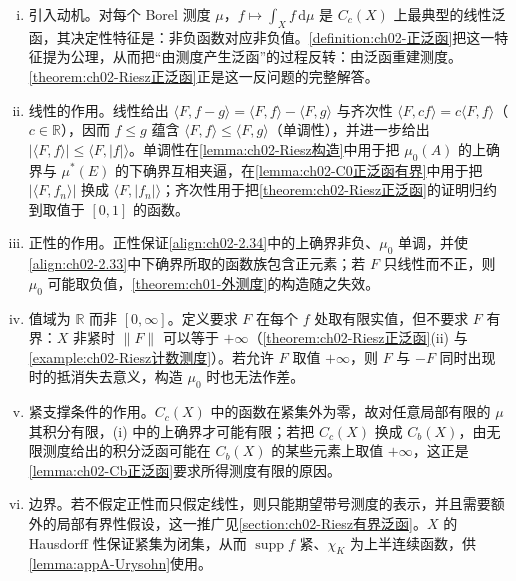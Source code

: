 \documentclass[../../main.tex]{subfiles}%
\begin{document}
\begin{remark}\label{remark:ch02-正泛函}
\begin{enumerate}[(i)]
\item 引入动机。对每个 Borel 测度 $\mu$，$f\mapsto\int_Xf\,\mathrm{d}\mu$ 是 $C_c(X)$ 上最典型的线性泛函，其决定性特征是：非负函数对应非负值。\cref{definition:ch02-正泛函}把这一特征提为公理，从而把“由测度产生泛函”的过程反转：由泛函重建测度。\cref{theorem:ch02-Riesz正泛函}正是这一反问题的完整解答。
\item 线性的作用。线性给出 $\langle F,f-g\rangle=\langle F,f\rangle-\langle F,g\rangle$ 与齐次性 $\langle F,cf\rangle=c\langle F,f\rangle$（$c\in\mathbb R$），因而 $f\leqslant g$ 蕴含 $\langle F,f\rangle\leqslant\langle F,g\rangle$（单调性），并进一步给出 $\left|\langle F,f\rangle\right|\leqslant\langle F,|f|\rangle$。单调性在\cref{lemma:ch02-Riesz构造}中用于把 $\mu_0(A)$ 的上确界与 $\mu^*(E)$ 的下确界互相夹逼，在\cref{lemma:ch02-C0正泛函有界}中用于把 $\left|\langle F,f_n\rangle\right|$ 换成 $\langle F,|f_n|\rangle$；齐次性用于把\cref{theorem:ch02-Riesz正泛函}的证明归约到取值于 $[0,1]$ 的函数。
\item 正性的作用。正性保证\eqref{align:ch02-2.34}中的上确界非负、$\mu_0$ 单调，并使\eqref{align:ch02-2.33}中下确界所取的函数族包含正元素；若 $F$ 只线性而不正，则 $\mu_0$ 可能取负值，\cref{theorem:ch01-外测度}的构造随之失效。
\item 值域为 $\mathbb R$ 而非 $[0,\infty]$。定义要求 $F$ 在每个 $f$ 处取有限实值，但不要求 $F$ 有界：$X$ 非紧时 $\|F\|$ 可以等于 $+\infty$（\cref{theorem:ch02-Riesz正泛函}(ii) 与\cref{example:ch02-Riesz计数测度}）。若允许 $F$ 取值 $+\infty$，则 $F$ 与 $-F$ 同时出现时的抵消失去意义，构造 $\mu_0$ 时也无法作差。
\item 紧支撑条件的作用。$C_c(X)$ 中的函数在紧集外为零，故对任意局部有限的 $\mu$ 其积分有限，(i) 中的上确界才可能有限；若把 $C_c(X)$ 换成 $C_b(X)$，由无限测度给出的积分泛函可能在 $C_b(X)$ 的某些元素上取值 $+\infty$，这正是\cref{lemma:ch02-Cb正泛函}要求所得测度有限的原因。
\item 边界。若不假定正性而只假定线性，则只能期望带号测度的表示，并且需要额外的局部有界性假设，这一推广见\cref{section:ch02-Riesz有界泛函}。$X$ 的 Hausdorff 性保证紧集为闭集，从而 $\operatorname{supp}f$ 紧、$\chi_K$ 为上半连续函数，供\cref{lemma:appA-Urysohn}使用。
\end{enumerate}
\end{remark}
\end{document}

